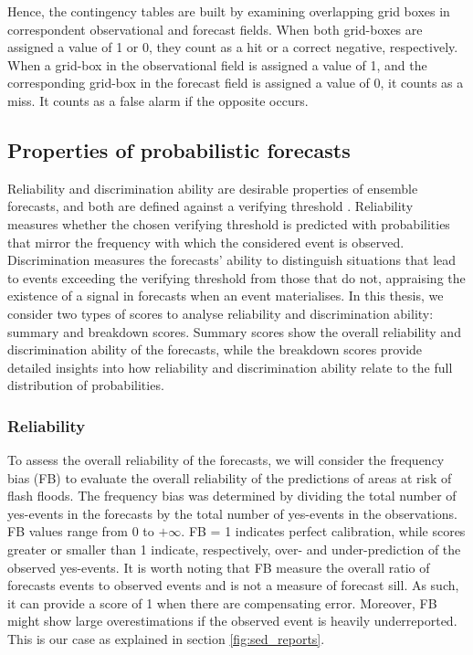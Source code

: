 Hence, the contingency tables are built by examining overlapping grid boxes in correspondent observational and forecast fields. When both grid-boxes are assigned a value of 1 or 0, they count as a hit or a correct negative, respectively. When a grid-box in the observational field is assigned a value of 1, and the corresponding grid-box in the forecast field is assigned a value of 0, it counts as a miss. It counts as a false alarm if the opposite occurs. 

\subsection{Properties of probabilistic forecasts}
Reliability and discrimination ability are desirable properties of ensemble forecasts, and both are defined against a verifying threshold \citep{Jolliffe_2012, Wilks_2020}. Reliability measures whether the chosen verifying threshold is predicted with probabilities that mirror the frequency with which the considered event is observed. Discrimination measures the forecasts' ability to distinguish situations that lead to events exceeding the verifying threshold from those that do not, appraising the existence of a signal in forecasts when an event materialises. In this thesis, we consider two types of scores to analyse reliability and discrimination ability: summary and breakdown scores. Summary scores show the overall reliability and discrimination ability of the forecasts, while the breakdown scores provide detailed insights into how reliability and discrimination ability relate to the full distribution of probabilities. 

\subsubsection{Reliability}
To assess the overall reliability of the forecasts, we will consider the frequency bias (FB) to evaluate the overall reliability of the predictions of areas at risk of flash floods. The frequency bias was determined by dividing the total number of yes-events in the forecasts by the total number of yes-events in the observations. FB values range from 0 to $+\infty$. FB = 1 indicates perfect calibration, while scores greater or smaller than 1 indicate, respectively, over- and under-prediction of the observed yes-events. It is worth noting that FB measure the overall ratio of forecasts events to observed events and is not a measure of forecast sill. As such, it can provide a score of 1 when there are compensating error. Moreover, FB might show large overestimations if the observed event is heavily underreported. This is our case as explained in section \ref{fig:sed_reports}.

